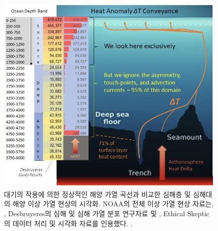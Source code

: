 \documentclass[10pt,twocolumn,letterpaper]{article}
\begin{document}
\begin{figure}[t]
\begin{center} 
\includegraphics[width=1\textwidth]{deepsea.jpg}
\end{center}
   \caption{대기의 작용에 의한 정상적인 해양 가열 곡선과 비교한 심해층 및 심해대의 해양 이상 가열  현상의 시각화.  NOAA의 전체 이상 가열 현상 자료는, \cite{147}, Desbruyeres의 심해 및 심해 가열 분포 연구자료 및 \cite{132},  Ethical Skeptic의 데이터 처리 및 시각화 자료를 인용했다.   \cite{129}.}
\label{fig:19}
\end{figure}
\end{document}
